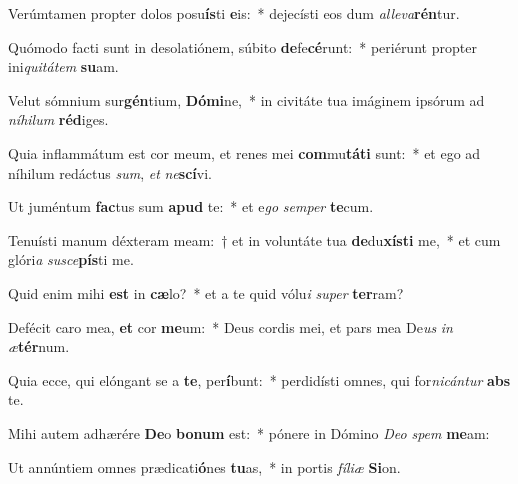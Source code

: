 \item Verúmtamen propter dolos posu\textbf{ís}ti \textbf{e}is:~* dejecísti eos dum \textit{al}\textit{le}\textit{va}\textbf{rén}tur.
\item Quómodo facti sunt in desolatiónem, súbito \textbf{de}fe\textbf{cé}runt:~* periérunt propter ini\textit{qui}\textit{tá}\textit{tem} \textbf{su}am.
\item Velut sómnium sur\textbf{gén}tium, \textbf{Dó}\textbf{mi}ne,~* in civitáte tua imáginem ipsórum ad \textit{ní}\textit{hi}\textit{lum} \textbf{réd}iges.
\item Quia inflammátum est cor meum, et renes mei \textbf{com}mu\textbf{tá}\textbf{ti} sunt:~* et ego ad níhilum redáctus \textit{sum}, \textit{et} \textit{ne}\textbf{scí}vi.
\item Ut juméntum \textbf{fac}tus sum \textbf{a}\textbf{pud} te:~* et e\textit{go} \textit{sem}\textit{per} \textbf{te}cum.
\item Tenuísti manum déxteram meam:~† et in voluntáte tua \textbf{de}du\textbf{xís}\textbf{ti} me,~* et cum glóri\textit{a} \textit{su}\textit{sce}\textbf{pís}ti me.
\item Quid enim mihi \textbf{est} in \textbf{cæ}lo?~* et a te quid vólu\textit{i} \textit{su}\textit{per} \textbf{ter}ram?
\item Defécit caro mea, \textbf{et} cor \textbf{me}um:~* Deus cordis mei, et pars mea De\textit{us} \textit{in} \textit{æ}\textbf{tér}num.
\item Quia ecce, qui elóngant se a \textbf{te}, per\textbf{í}bunt:~* perdidísti omnes, qui for\textit{ni}\textit{cán}\textit{tur} \textbf{abs} te.
\item Mihi autem adhærére \textbf{De}o \textbf{bo}\textbf{num} est:~* pónere in Dómino \textit{De}\textit{o} \textit{spem} \textbf{me}am:
\item Ut annúntiem omnes prædicati\textbf{ó}nes \textbf{tu}as,~* in portis \textit{fí}\textit{li}\textit{æ} \textbf{Si}on.
